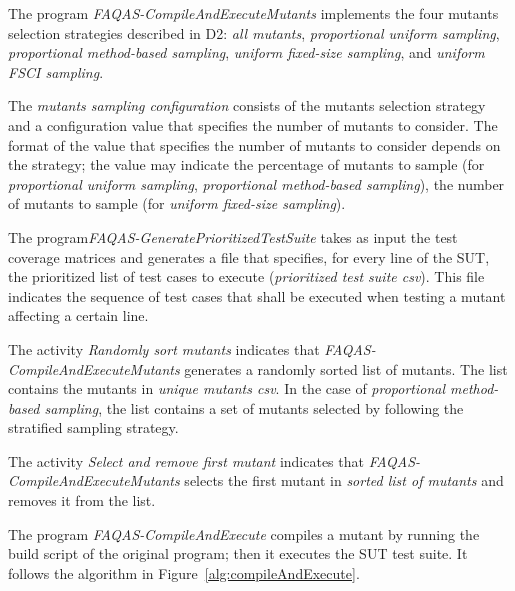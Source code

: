 The program \emph{FAQAS-CompileAndExecuteMutants} implements the four mutants selection strategies described in D2: \emph{all mutants}, \emph{proportional uniform sampling}, \emph{proportional method-based sampling}, \emph{uniform fixed-size sampling}, and \emph{uniform FSCI sampling}.

The \emph{mutants sampling configuration} consists of the mutants selection strategy and a configuration value that specifies the number of mutants to consider. The format of the value that specifies the number of mutants to consider depends on the strategy; the value may indicate the percentage of mutants to sample (for \emph{proportional uniform sampling}, \emph{proportional method-based sampling}), the number of mutants to sample (for \emph{uniform fixed-size sampling}).

The program\emph{FAQAS-GeneratePrioritizedTestSuite} takes as input the test coverage matrices and generates a file that specifies, for every line of the SUT, the prioritized list of test cases to execute (\emph{prioritized test suite csv}). This file indicates the sequence of test cases that shall be executed when testing a mutant affecting a certain line.

The activity \emph{Randomly sort mutants} indicates that  \emph{FAQAS-CompileAndExecuteMutants} generates a randomly sorted list of mutants. The list contains the mutants in \emph{unique mutants csv}.
In the case of \emph{proportional method-based sampling}, the list contains a set of mutants selected by following the stratified sampling strategy.

The activity \emph{Select and remove first mutant} indicates that  \emph{FAQAS-CompileAndExecuteMutants} selects the first mutant in \emph{sorted list of mutants} and removes it from the list.

The program \emph{FAQAS-CompileAndExecute} compiles a mutant by running the build script of the original program; then it executes the SUT test suite. It follows the algorithm in Figure~\ref{alg:compileAndExecute}.


